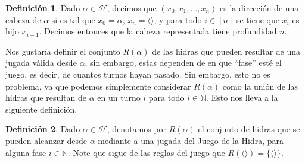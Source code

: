 \documentclass[a4paper,11pt]{article}
\newcommand{\matN}{\mathbb{N}}
\newcommand{\mH}{\mathcal{H}}
\newcommand{\lag}{\langle}
\newcommand{\rag}{\rangle}
\theoremstyle{definition}
\newtheorem{definition}{Definición}
\begin{document}
\begin{definition}
  Dado $\alpha \in \mH$, decimos que $(x_0,x_1,\dots,x_n)$ es la
  dirección de una cabeza de $\alpha$ si es tal que
  $x_0 = \alpha$, $x_n = \lag\rag$, y para todo
  $i \in [n]$ se tiene que $x_{i}$ es hijo $x_{i-1}$. Decimos entonces
  que la cabeza representada tiene profundidad $n$.
\end{definition}

Nos gustaría definir el conjunto $R(\alpha)$ de las hidras
que pueden resultar de una jugada válida desde $\alpha$, sin embargo,
estas dependen de en que ``fase'' esté el juego, es decir, de cuantos
turnos hayan pasado. Sin embargo, esto no es problema, ya que podemos
simplemente considerar $R(\alpha)$ como la unión de las hidras
que resultan de $\alpha$ en un turno $i$ para todo $i \in \matN$. Esto
nos lleva a la siguiente definición.

\begin{definition}
  Dado $\alpha \in \mH$, denotamos por $R(\alpha)$ el conjunto
  de hidras que se pueden alcanzar desde $\alpha$ mediante a una
  jugada del Juego de la Hidra, para alguna fase $i \in \matN$. Note
  que sigue de las reglas del juego que $R(\lag\rag) = \{\lag\rag\}$.
\end{definition}
\end{document}
